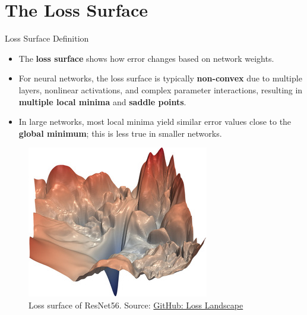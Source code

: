\documentclass[serif, aspectratio=169]{beamer}
\begin{document}
\section{The Loss Surface}
\begin{frame}{Loss Surface Definition}
\begin{minipage}{0.6\linewidth}
    \begin{itemize}
        \item The \textbf{loss surface} shows how error changes based on network weights.
        \item For neural networks, the loss surface is typically \textbf{non-convex} due to multiple layers, nonlinear activations, and complex parameter interactions, resulting in \textbf{multiple local minima} and \textbf{saddle points}.
        \item In large networks, most local minima yield similar error values close to the \textbf{global minimum}; this is less true in smaller networks.
    \end{itemize}
\end{minipage}%
\begin{minipage}{0.3\linewidth}
    \begin{figure}[h]
        \centering
        \includegraphics[height=0.6\textheight]{pic/resnet56_noshort_small.jpg}
        \caption{\footnotesize Loss surface of ResNet56. Source: \href{https://github.com/tomgoldstein/loss-landscape}{GitHub: Loss Landscape}}
    \end{figure}
\end{minipage}
\end{frame}
\end{document}
